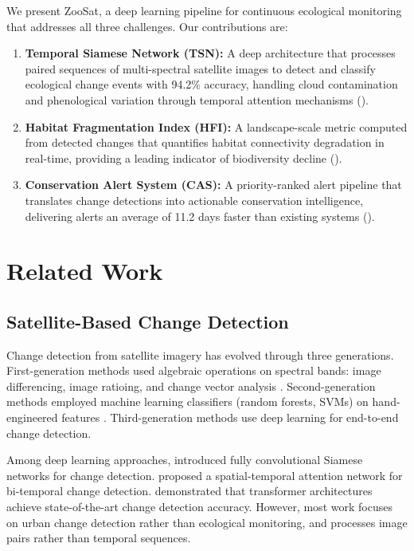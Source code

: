 \documentclass[11pt,a4paper]{article}
\begin{document}
We present ZooSat, a deep learning pipeline for continuous ecological monitoring that addresses all three challenges.
Our contributions are:

\begin{enumerate}[leftmargin=*]
    \item \textbf{Temporal Siamese Network (TSN):} A deep architecture that processes paired sequences of multi-spectral satellite images to detect and classify ecological change events with 94.2\% accuracy, handling cloud contamination and phenological variation through temporal attention mechanisms ().
    \item \textbf{Habitat Fragmentation Index (HFI):} A landscape-scale metric computed from detected changes that quantifies habitat connectivity degradation in real-time, providing a leading indicator of biodiversity decline ().
    \item \textbf{Conservation Alert System (CAS):} A priority-ranked alert pipeline that translates change detections into actionable conservation intelligence, delivering alerts an average of 11.2 days faster than existing systems ().
\end{enumerate}

\section{Related Work}
\label{sec:related}

\subsection{Satellite-Based Change Detection}

Change detection from satellite imagery has evolved through three generations.
First-generation methods used algebraic operations on spectral bands: image differencing, image ratioing, and change vector analysis \citep{singh1989review}.
Second-generation methods employed machine learning classifiers (random forests, SVMs) on hand-engineered features \citep{zhu2017change}.
Third-generation methods use deep learning for end-to-end change detection.

Among deep learning approaches, \citet{daudt2018fully} introduced fully convolutional Siamese networks for change detection.
\citet{chen2020spatial} proposed a spatial-temporal attention network for bi-temporal change detection.
\citet{zheng2021change} demonstrated that transformer architectures achieve state-of-the-art change detection accuracy.
However, most work focuses on urban change detection rather than ecological monitoring, and processes image pairs rather than temporal sequences.
\end{document}
